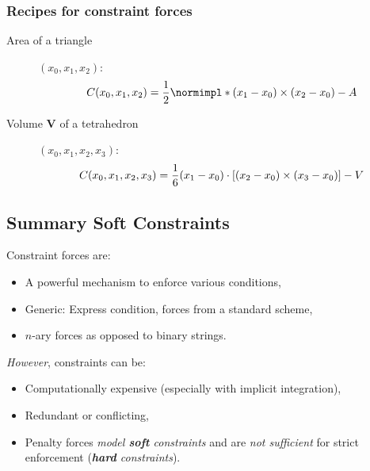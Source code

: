 \subsubsection{Recipes for constraint forces}
\begin{description}
	\item[Area of a triangle] $(x_0, x_1, x_2)$:
		\begin{align*}
			C(x_0, x_1, x_2) = {1\over 2} \norm{(x_1-x_0) \times (x_2-x_0)}-A
		\end{align*}
	\item[Volume $\mathbf V$ of a tetrahedron] $(x_0, x_1, x_2, x_3)$:
		\begin{align*}
			C(x_0, x_1, x_2, x_3) = {1\over 6} (x_1-x_0) \cdot \left[ (x_2-x_0) \times (x_3-x_0) \right]-V
		\end{align*}
\end{description}

\subsection{Summary Soft Constraints}
Constraint forces are:
\begin{itemize}
	\item A powerful mechanism to enforce various conditions,
	\item Generic: Express condition, forces from a standard scheme,
	\item $n$-ary forces as opposed to binary strings.
\end{itemize}

\emph{However}, constraints can be:
\begin{itemize}
	\item Computationally expensive (especially with implicit integration),
	\item Redundant or conflicting,
	\item Penalty forces \emph{model \textbf{soft} constraints} and are \emph{not sufficient} for strict enforcement (\emph{\textbf{hard} constraints}).
\end{itemize}

